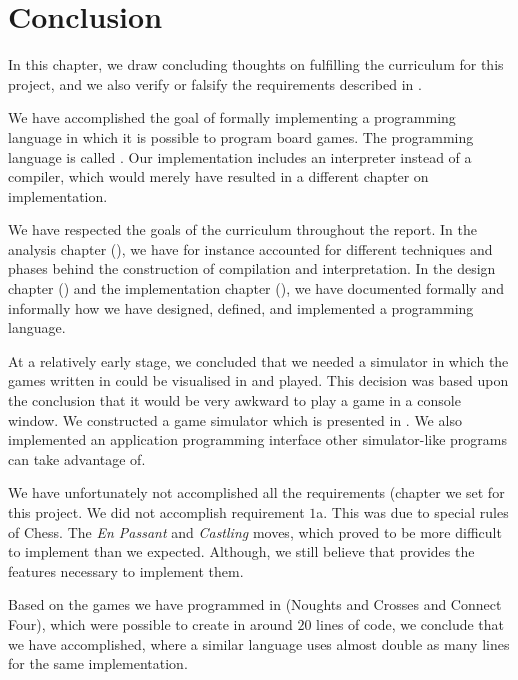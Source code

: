 \chapter{Conclusion}
\label{chap:conclusion}

In this chapter, we draw concluding thoughts on fulfilling the
curriculum for this project, and we also verify or falsify the
requirements described in .

We have accomplished the goal of formally implementing a programming
language in which it is possible to program board games. The programming
language is called \productname{}. Our implementation includes an
interpreter instead of a compiler, which would merely have resulted in a
different chapter on implementation.

We have respected the goals of the curriculum throughout the
report. In the analysis chapter (), we
have for instance accounted for different techniques and phases behind the
construction of compilation and interpretation. In the design
chapter () and the implementation chapter
(), we have documented formally and
informally how we have designed, defined, and implemented a programming
language.

At a relatively early stage, we concluded that we needed a simulator
in which the games written in \productname{} could be visualised in
and played. This decision was based upon the conclusion that it would
be very awkward to play a game in a console window. We constructed a
game simulator which is presented in . We also
implemented an application programming interface other simulator-like
programs can take advantage of.

We have unfortunately not accomplished all the requirements (chapter
 we set for this project. We did not
accomplish requirement $1$a. This was due to special rules of Chess.
The \textit{En Passant} and \textit{Castling} moves, which proved to be more
difficult to implement than we expected. Although, we still believe that
\productname{} provides the features necessary to implement them.

Based on the games we have programmed in \productname{} (Noughts and
Crosses and Connect Four), which were possible to create in around $20$
lines of code, we conclude that we have accomplished, where a similar
language uses almost double as many lines for the same implementation.

